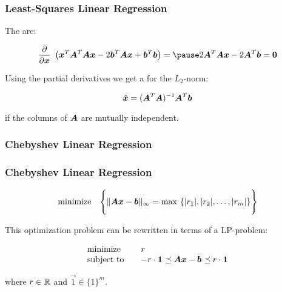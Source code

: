 \begin{frame}
  \frametitle{Least-Squares Linear Regression \cont}

  The  are:

  \begin{displaymath}
    \frac{\partial}{\partial \vec x} \ \left( \vec x^T \mat A^T \mat A\vec x - 2 \vec b^T \mat A\vec x + \vec b^T \vec b \right)
    = \pause 2 \mat A^T \mat A \vec x - 2 \mat A^T \vec b = \vec{0}
  \end{displaymath}

  Using the partial derivatives we get a  for the $L_2$-norm: \pause 

  \begin{displaymath}
    \hat{{\bm x}} = ({\bm A}^T {\bm A})^{-1}{\bm A}^T {\bm b}
  \end{displaymath}

  if the columns of ${\bm A}$ are mutually independent.
\end{frame}


\subsubsection{Chebyshev Linear Regression}

\begin{frame}

  \frametitle{Chebyshev Linear Regression}
 

  \begin{displaymath}
    \mbox{minimize}\quad \Bigg\{ \| {\bm A} {\bm x} -{\bm b}\|_\infty = \max\ \{ |r_1|, |r_2|, \dots, |r_m|\} \Bigg\}
  \end{displaymath}
  \pause

  This optimization problem can be rewritten in terms of a LP-problem:

  \begin{eqnarray*}
    \begin{array}{lcl}
     \mbox{minimize}& & r\\
     \mbox{subject to} & &   - r\cdot {\bm 1} \preceq {\bm A} {\bm x} - {\bm b} \preceq r\cdot {\bm 1}
    \end{array}
  \end{eqnarray*}

  where $r\in \mathbb{R}$ and $\vec 1 \in \{1\}^m$.
\end{frame}


